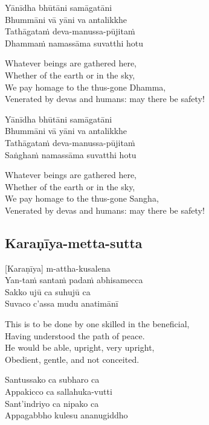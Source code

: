 Yānīdha bhūtāni samāgatāni\\
Bhummāni vā yāni va antalikkhe\\
Tathāgataṁ deva-manussa-pūjitaṁ\\
Dhammaṁ namassāma suvatthi hotu

\begin{english}
  Whatever beings are gathered here,\\
  Whether of the earth or in the sky,\\
  We pay homage to the thus-gone Dhamma,\\
  Venerated by devas and humans: may there be safety!
\end{english}

Yānīdha bhūtāni samāgatāni\\
Bhummāni vā yāni va antalikkhe\\
Tathāgataṁ deva-manussa-pūjitaṁ\\
Saṅghaṁ namassāma suvatthi hotu

\begin{english}
  Whatever beings are gathered here,\\
  Whether of the earth or in the sky,\\
  We pay homage to the thus-gone Sangha,\\
  Venerated by devas and humans: may there be safety!
\end{english}

\suttaRef{[Snp 2.1]}

\subsection{Karaṇīya-metta-sutta}
[Karaṇīya] m-attha-kusalena\\
Yan-taṁ santaṁ padaṁ abhisamecca\\
Sakko ujū ca suhujū ca\\
Suvaco c’assa mudu anatimānī

\begin{english}
  This is to be done by one skilled in the beneficial,\\
  Having understood the path of peace.\\
  He would be able, upright, very upright,\\
  Obedient, gentle, and not conceited.
\end{english}

Santussako ca subharo ca\\
Appakicco ca sallahuka-vutti\\
Sant’indriyo ca nipako ca\\
Appagabbho kulesu ananugiddho

